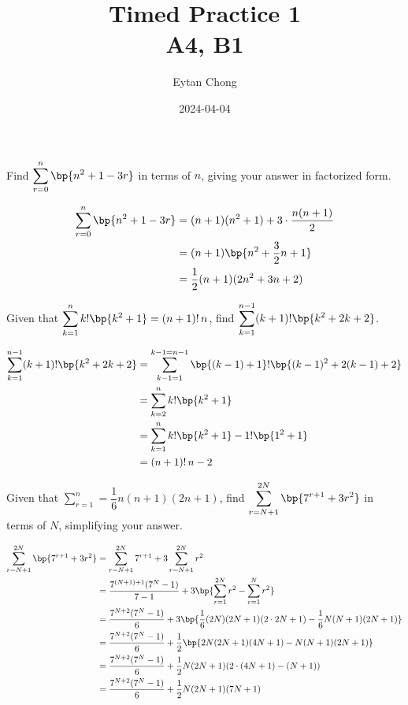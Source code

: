 \documentclass{echw}
\title{Timed Practice 1\\A4, B1}
\author{Eytan Chong}
\date{2024-04-04}
\begin{document}
    \problem{}
        Find $\displaystyle\sum\limits_{r = 0}^n \bp{n^2 + 1 - 3r}$ in terms of $n$, giving your answer in factorized form.

    \solution
        \begin{align*}
            \sum_{r = 0}^n \bp{n^2 + 1 - 3r} &= (n+1)(n^2 + 1) + 3 \cdot \dfrac{n(n+1)}2\\
            &= (n+1)\bp{n^2 + \dfrac32 n + 1}\\
            &= \dfrac12 (n+1)(2n^2 + 3n + 2)
        \end{align*}


    \problem{}
        Given that $\displaystyle\sum\limits_{k=1}^n k!\bp{k^2 + 1} = (n+1)!\,n$, find $\displaystyle\sum\limits_{k=1}^{n-1} (k+1)!\bp{k^2 + 2k + 2}$.

    \solution
        \begin{align*}
            \sum_{k=1}^{n-1} (k+1)!\bp{k^2 + 2k + 2} &= \sum_{k-1=1}^{k-1=n-1} \bp{(k-1)+1}!\bp{(k-1)^2 + 2(k-1) + 2}\\
            &= \sum_{k=2}^{n} k! \bp{k^2 + 1}\\
            &= \sum_{k=1}^{n} k! \bp{k^2 + 1} - 1! \bp{1^2 + 1}\\
            &= (n+1)! \, n - 2
        \end{align*}


    \problem{}
        Given that $\displaystyle\sum\limits_{r=1}^n = \dfrac16 n(n+1)(2n+1)$, find $\displaystyle\sum\limits_{r=N+1}^{2N} \bp{7^{r+1} + 3r^2}$ in terms of $N$, simplifying your answer.

    \solution
        \begin{align*}
            \sum_{r=N+1}^{2N} \bp{7^{r+1} + 3r^2} &= \sum_{r=N+1}^{2N} 7^{r+1} + 3\sum_{r=N+1}^{2N} r^2 \\
            &= \dfrac{7^{(N+1)+1}(7^N - 1)}{7-1} + 3\bp{\sum_{r=1}^{2N} r^2 - \sum_{r=1}^{N} r^2}\\
            &= \dfrac{7^{N+2}(7^N - 1)}{6} + 3\bp{\dfrac16 (2N)(2N+1)(2 \cdot 2N + 1) - \dfrac16 N(N+1)(2N+1)}\\
            &= \dfrac{7^{N+2}(7^N - 1)}{6} + \dfrac12\bp{2N(2N+1)(4N + 1) - N(N+1)(2N+1)}\\
            &= \dfrac{7^{N+2}(7^N - 1)}{6} + \dfrac12 N(2N+1)(2 \cdot (4N + 1) - (N+1))\\
            &= \dfrac{7^{N+2}(7^N - 1)}{6} + \dfrac12 N(2N+1)(7N+1)
        \end{align*}
\end{document}
